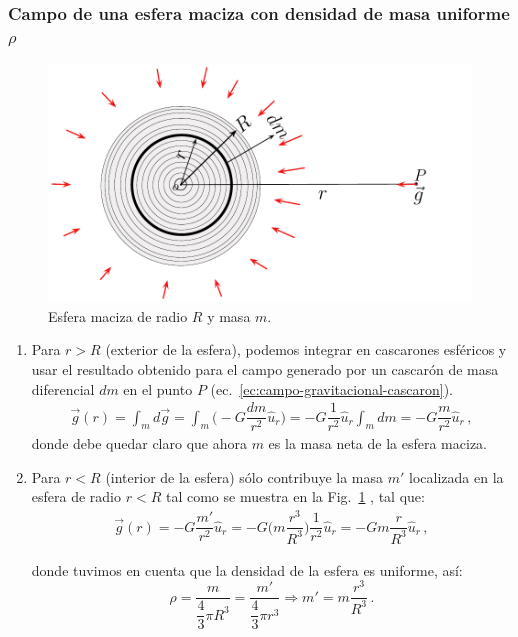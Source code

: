 \subsubsection{Campo de una esfera maciza con densidad de masa uniforme $\rho$}
%
\begin{figure}[h]
\begin{center}
\includegraphics[scale=0.7]{gravitacion/esfera2}
\end{center}
\caption{Esfera maciza de radio $R$ y masa $m$.}
\label{fig:gravitacion-esfera2}
\end{figure}
%
\begin{enumerate}
\item Para $r > R$ (exterior de la esfera), podemos integrar en cascarones esféricos y usar el resultado obtenido para el campo generado por un cascarón de masa diferencial $dm$ en el punto $P$ (ec.~\eqref{ec:campo-gravitacional-cascaron}).
\begin{eqnarray}
\vec{g}(r)=\int_m d \vec{g} = \int_m \bigg(-G \dfrac{dm}{r^2}\hat{u}_r \bigg)=-G \dfrac{1}{r^2}\hat{u}_r\int_m dm= -G \dfrac{m}{r^2}\hat{u}_r\,,
\label{ec:campo-gravitacional-esfera-exterior}
\end{eqnarray}
donde debe quedar claro que ahora $m$ es la masa neta de la esfera maciza.

\item Para $r < R$ (interior de la esfera) sólo contribuye la masa $m'$ localizada en la esfera de radio $r < R$ tal como se muestra en la Fig.~\ref{fig:gravitacion-esfera2} , tal que:
\begin{eqnarray}
\vec{g}(r)=-G \dfrac{m'}{r^2}\hat{u}_r = -G \bigg(m \dfrac{r^3}{R^3} \bigg)\dfrac{1}{r^2}\hat{u}_r= -Gm \dfrac{r}{R^3}\hat{u}_r\,,
\label{ec:campo-gravitacional-esfera-interior}
\end{eqnarray}

donde tuvimos en cuenta que la densidad de la esfera es uniforme, así:
\begin{displaymath}
\rho=\dfrac{m}{\dfrac{4}{3}\pi R^3 } = \dfrac{m'}{\dfrac{4}{3}\pi r^3 } \Rightarrow m'=m \dfrac{r^3}{R^3}\,.
\end{displaymath}

\end{enumerate}

